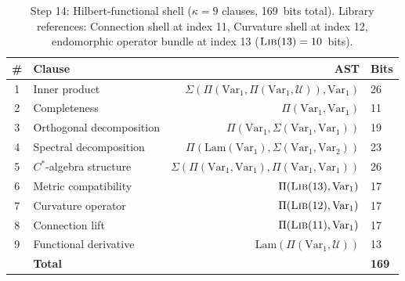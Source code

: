 \documentclass[11pt,a4paper]{article}
\theoremstyle{plain}
\theoremstyle{definition}
\theoremstyle{remark}
\newcommand{\U}{\mathcal{U}}
\begin{document}
\begin{table}[tbp]
\centering
\caption{Step 14: Hilbert-functional shell ($\kappa = 9$ clauses, 169~bits total).  Library references: Connection shell at index 11, Curvature shell at index 12, endomorphic operator bundle at index 13 ($\textsc{Lib}(13) = 10$~bits).}
\label{tab:step14}
\small
\begin{tabular}{@{}clrl@{}}
\toprule
\# & Clause & AST & Bits \\
\midrule
1 & Inner product               & $\Sigma(\Pi(\mathrm{Var}_1, \Pi(\mathrm{Var}_1, \U)), \mathrm{Var}_1)$ & 26 \\
2 & Completeness                & $\Pi(\mathrm{Var}_1, \mathrm{Var}_1)$ & 11 \\
3 & Orthogonal decomposition    & $\Pi(\mathrm{Var}_1, \Sigma(\mathrm{Var}_1, \mathrm{Var}_1))$ & 19 \\
4 & Spectral decomposition      & $\Pi(\mathrm{Lam}(\mathrm{Var}_1), \Sigma(\mathrm{Var}_1, \mathrm{Var}_2))$ & 23 \\
5 & $C^*$-algebra structure     & $\Sigma(\Pi(\mathrm{Var}_1, \mathrm{Var}_1), \Pi(\mathrm{Var}_1, \mathrm{Var}_1))$ & 26 \\
6 & Metric compatibility        & $\Pi(\textsc{Lib}(13), \mathrm{Var}_1)$ & 17 \\
7 & Curvature operator          & $\Pi(\textsc{Lib}(12), \mathrm{Var}_1)$ & 17 \\
8 & Connection lift             & $\Pi(\textsc{Lib}(11), \mathrm{Var}_1)$ & 17 \\
9 & Functional derivative       & $\mathrm{Lam}(\Pi(\mathrm{Var}_1, \U))$ & 13 \\
\midrule
  & \textbf{Total} & & \textbf{169} \\
\bottomrule
\end{tabular}
\end{table}
\end{document}
